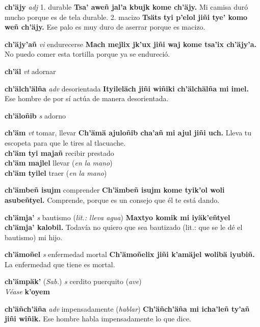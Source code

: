 \documentclass[10pt]{scrbook}
\newcommand{\entry}[1]{\textbf{#1}}
\newcommand{\onedefinition}[1]{#1.}
\newcommand{\partofspeech}[1]{\textit{#1}}
\newcommand{\spanishtranslation}[1]{#1}
\newcommand{\clarification}[1]{(\textit{#1})}
\newcommand{\cholexample}[1]{\textbf{#1}}
\newcommand{\exampletranslation}[1]{#1}
\newcommand{\alsosee}[1]{\\\textit{Véase} \textbf{#1}}
\newcommand{\relevantdialect}[1]{(\textit{#1})}
\newcommand{\secondaryentry}[1]{\\\textbf{#1}}
\newcommand{\secondtranslation}[1]{#1}
\begin{document}
\begin{multicols}{2}
\entry{ch'äjy}
\partofspeech{adj}
\onedefinition{1}
\spanishtranslation{durable}
\cholexample{Tsa' aweñ jal'a kbujk kome ch'äjy.}
\exampletranslation{Mi camisa duró mucho porque es de tela durable.}
\onedefinition{2}
\spanishtranslation{macizo}
\cholexample{Tsäts tyi p'elol jiñi tye' komo weñ ch'äjy.}
\exampletranslation{Ese palo es muy duro de aserrar porque es macizo.}

\entry{ch'äjy'añ}
\partofspeech{vi}
\spanishtranslation{endurecerse}
\cholexample{Mach mejlix jk'ux jiñi waj kome tsa'ix ch'äjy'a.}
\exampletranslation{No puedo comer esta tortilla porque ya se endureció.}

\entry{ch'äl}
\partofspeech{vt}
\spanishtranslation{adornar}

\entry{ch'älch'älña}
\partofspeech{adv}
\spanishtranslation{desorientada}
\cholexample{Ityileläch jiñi wiñiki ch'älchälña mi imel.}
\exampletranslation{Ese hombre de por sí actúa de manera desorientada.}

\entry{ch'äloñib}
\partofspeech{s}
\spanishtranslation{adorno}

\entry{ch'äm}
\partofspeech{vt}
\spanishtranslation{tomar, llevar}
\cholexample{Ch'ämä ajuloñib cha'añ mi ajul jiñi uch.}
\exampletranslation{Lleva tu escopeta para que le tires al tlacuache.}
\secondaryentry{ch'äm tyi majañ}
\secondtranslation{recibir prestado}
\secondaryentry{ch'äm majlel}
\secondtranslation{llevar}
\clarification{en la mano}
\secondaryentry{ch'äm tyilel}
\secondtranslation{traer}
\clarification{en la mano}

\entry{ch'ämbeñ isujm}
\spanishtranslation{comprender}
\cholexample{Ch'ämbeñ isujm kome tyik'ol woli asubeñtyel.}
\exampletranslation{Comprende, porque es un consejo que él te está dando.}

\entry{ch'ämja'}
\partofspeech{s}
\spanishtranslation{bautismo}
\clarification{lit.: lleva agua}
\cholexample{Maxtyo komik mi iyäk'eñtyel ch'ämja' kalobil.}
\exampletranslation{Todavía no quiero que sea bautizado (lit.: que se le dé el bautismo) mi hijo.}

\entry{ch'ämoñel}
\partofspeech{s}
\spanishtranslation{enfermedad mortal}
\cholexample{Ch'ämoñelix jiñi k'amäjel wolibä iyubiñ.}
\exampletranslation{La enfermedad que tiene es mortal.}

\entry{ch'ämpäk'}
\relevantdialect{Sab.}
\partofspeech{s}
\spanishtranslation{cerdito}
\spanishtranslation{puerquito}
\clarification{ave}
\alsosee{k'oyem}

\entry{ch'äñch'äña}
\partofspeech{adv}
\spanishtranslation{impensadamente}
\clarification{hablar}
\cholexample{Ch'äñch'äña mi icha'leñ ty'añ jiñi wiñik.}
\exampletranslation{Ese hombre habla impensadamente lo que dice.}


\end{multicols}
\end{document}
